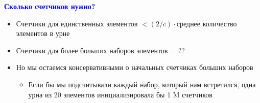 \documentclass[landscape]{slides}
\begin{document}
\begin{normalsize}
\begin{slide}
\textbf{\textcolor{blue}{Сколько счетчиков нужно?}}

\begin{itemize}
\item Счетчики для единственных элементов $<(2/c)\cdot$среднее количество элементов в урне
\item Счетчики для более больших наборов элементов = ??
\item Но мы остаемся консервативными о начальных счетчиках больших наборов
  \begin{itemize}
  \item Если бы мы подсчитывали каждый набор, который нам встретился, одна урна из 20 элементов инициализировала бы 1 M счетчиков
  \end{itemize}
\end{itemize}
\end{slide}



\end{normalsize}
\end{document}
